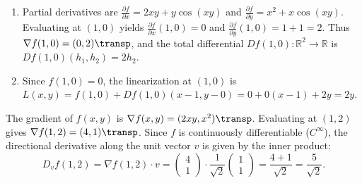 \begin{exercisesolution}
\begin{enumerate}[label=\textbf{(\alph*)}]
  \item Partial derivatives are $\frac{\partial f}{\partial x} = 2xy + y\cos(xy)$ and $\frac{\partial f}{\partial y} = x^2 + x\cos(xy)$. Evaluating at $(1,0)$ yields $\frac{\partial f}{\partial x}(1,0) = 0$ and $\frac{\partial f}{\partial y}(1,0) = 1 + 1 = 2$. Thus $\nabla f(1,0) = (0, 2)\transp$, and the total differential $Df(1,0) \colon \mathbb{R}^2 \to \mathbb{R}$ is $Df(1,0)(h_1, h_2) = 2h_2$.
  \item Since $f(1,0) = 0$, the linearization at $(1,0)$ is $L(x,y) = f(1,0) + Df(1,0)(x-1, y-0) = 0 + 0(x-1) + 2y = 2y$.
\end{enumerate}
\end{exercisesolution}

\begin{exercisesolution}
The gradient of $f(x,y)$ is $\nabla f(x,y) = (2xy, x^2)\transp$. Evaluating at $(1,2)$ gives $\nabla f(1,2) = (4,1)\transp$. Since $f$ is continuously differentiable ($C^\infty$), the directional derivative along the unit vector $v$ is given by the inner product:
\[
D_v f(1,2) = \nabla f(1,2) \cdot v = \begin{pmatrix} 4 \\ 1 \end{pmatrix} \cdot \frac{1}{\sqrt{2}}\begin{pmatrix} 1 \\ 1 \end{pmatrix} = \frac{4 + 1}{\sqrt{2}} = \frac{5}{\sqrt{2}}.
\]
\end{exercisesolution}
